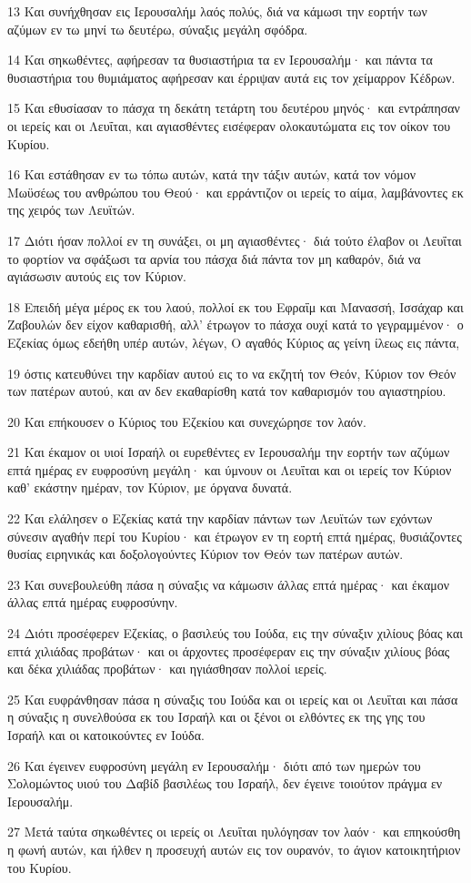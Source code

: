 \par 13 Και συνήχθησαν εις Ιερουσαλήμ λαός πολύς, διά να κάμωσι την εορτήν των αζύμων εν τω μηνί τω δευτέρω, σύναξις μεγάλη σφόδρα.
\par 14 Και σηκωθέντες, αφήρεσαν τα θυσιαστήρια τα εν Ιερουσαλήμ· και πάντα τα θυσιαστήρια του θυμιάματος αφήρεσαν και έρριψαν αυτά εις τον χείμαρρον Κέδρων.
\par 15 Και εθυσίασαν το πάσχα τη δεκάτη τετάρτη του δευτέρου μηνός· και εντράπησαν οι ιερείς και οι Λευΐται, και αγιασθέντες εισέφεραν ολοκαυτώματα εις τον οίκον του Κυρίου.
\par 16 Και εστάθησαν εν τω τόπω αυτών, κατά την τάξιν αυτών, κατά τον νόμον Μωϋσέως του ανθρώπου του Θεού· και ερράντιζον οι ιερείς το αίμα, λαμβάνοντες εκ της χειρός των Λευϊτών.
\par 17 Διότι ήσαν πολλοί εν τη συνάξει, οι μη αγιασθέντες· διά τούτο έλαβον οι Λευΐται το φορτίον να σφάξωσι τα αρνία του πάσχα διά πάντα τον μη καθαρόν, διά να αγιάσωσιν αυτούς εις τον Κύριον.
\par 18 Επειδή μέγα μέρος εκ του λαού, πολλοί εκ του Εφραΐμ και Μανασσή, Ισσάχαρ και Ζαβουλών δεν είχον καθαρισθή, αλλ' έτρωγον το πάσχα ουχί κατά το γεγραμμένον· ο Εζεκίας όμως εδεήθη υπέρ αυτών, λέγων, Ο αγαθός Κύριος ας γείνη ίλεως εις πάντα,
\par 19 όστις κατευθύνει την καρδίαν αυτού εις το να εκζητή τον Θεόν, Κύριον τον Θεόν των πατέρων αυτού, και αν δεν εκαθαρίσθη κατά τον καθαρισμόν του αγιαστηρίου.
\par 20 Και επήκουσεν ο Κύριος του Εζεκίου και συνεχώρησε τον λαόν.
\par 21 Και έκαμον οι υιοί Ισραήλ οι ευρεθέντες εν Ιερουσαλήμ την εορτήν των αζύμων επτά ημέρας εν ευφροσύνη μεγάλη· και ύμνουν οι Λευΐται και οι ιερείς τον Κύριον καθ' εκάστην ημέραν, τον Κύριον, με όργανα δυνατά.
\par 22 Και ελάλησεν ο Εζεκίας κατά την καρδίαν πάντων των Λευϊτών των εχόντων σύνεσιν αγαθήν περί του Κυρίου· και έτρωγον εν τη εορτή επτά ημέρας, θυσιάζοντες θυσίας ειρηνικάς και δοξολογούντες Κύριον τον Θεόν των πατέρων αυτών.
\par 23 Και συνεβουλεύθη πάσα η σύναξις να κάμωσιν άλλας επτά ημέρας· και έκαμον άλλας επτά ημέρας ευφροσύνην.
\par 24 Διότι προσέφερεν Εζεκίας, ο βασιλεύς του Ιούδα, εις την σύναξιν χιλίους βόας και επτά χιλιάδας προβάτων· και οι άρχοντες προσέφεραν εις την σύναξιν χιλίους βόας και δέκα χιλιάδας προβάτων· και ηγιάσθησαν πολλοί ιερείς.
\par 25 Και ευφράνθησαν πάσα η σύναξις του Ιούδα και οι ιερείς και οι Λευΐται και πάσα η σύναξις η συνελθούσα εκ του Ισραήλ και οι ξένοι οι ελθόντες εκ της γης του Ισραήλ και οι κατοικούντες εν Ιούδα.
\par 26 Και έγεινεν ευφροσύνη μεγάλη εν Ιερουσαλήμ· διότι από των ημερών του Σολομώντος υιού του Δαβίδ βασιλέως του Ισραήλ, δεν έγεινε τοιούτον πράγμα εν Ιερουσαλήμ.
\par 27 Μετά ταύτα σηκωθέντες οι ιερείς οι Λευΐται ηυλόγησαν τον λαόν· και επηκούσθη η φωνή αυτών, και ήλθεν η προσευχή αυτών εις τον ουρανόν, το άγιον κατοικητήριον του Κυρίου.

